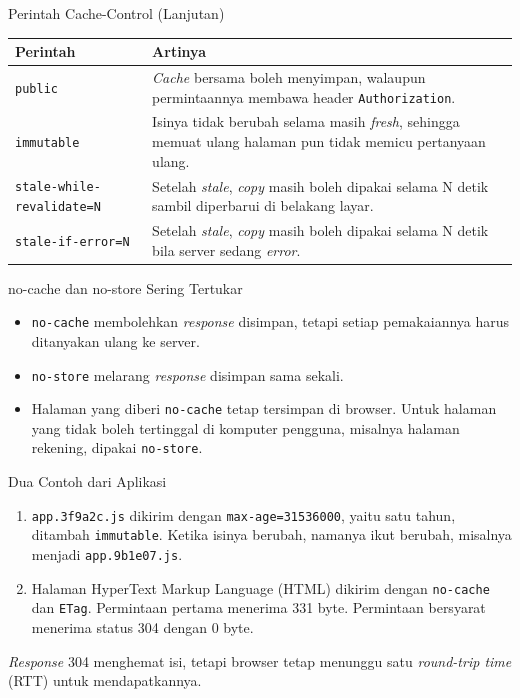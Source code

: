 \documentclass[aspectratio=169, table, 12pt]{beamer}
\begin{document}
\begin{frame}{{\Large Perintah Cache-Control (Lanjutan)}}
  \vspace{6pt}
  \centering
  {\footnotesize
  \begin{tabularx}{\textwidth}{lX}
    \hline
    \textbf{Perintah} & \textbf{Artinya} \\
    \hline
    \texttt{public} & \textit{Cache} bersama boleh menyimpan, walaupun permintaannya membawa header \texttt{Authorization}. \\
    \hline
    \texttt{immutable} & Isinya tidak berubah selama masih \textit{fresh}, sehingga memuat ulang halaman pun tidak memicu pertanyaan ulang. \\
    \hline
    \texttt{stale-while-revalidate=N} & Setelah \textit{stale}, \textit{copy} masih boleh dipakai selama N detik sambil diperbarui di belakang layar. \\
    \hline
    \texttt{stale-if-error=N} & Setelah \textit{stale}, \textit{copy} masih boleh dipakai selama N detik bila server sedang \textit{error}. \\
    \hline
  \end{tabularx}}
\end{frame}

\begin{frame}{{\Large no-cache dan no-store Sering Tertukar}}
  \vspace{10pt}
  \begin{itemize}
    \item \texttt{no-cache} membolehkan \textit{response} disimpan, tetapi setiap
          pemakaiannya harus ditanyakan ulang ke server.
    \item \texttt{no-store} melarang \textit{response} disimpan sama sekali.
    \item Halaman yang diberi \texttt{no-cache} tetap tersimpan di browser.
          Untuk halaman yang tidak boleh tertinggal di komputer pengguna,
          misalnya halaman rekening, dipakai \texttt{no-store}.
  \end{itemize}
\end{frame}

\begin{frame}{{\Large Dua Contoh dari Aplikasi}}
  \vspace{8pt}
  \begin{enumerate}
    \item \texttt{app.3f9a2c.js} dikirim dengan \texttt{max-age=31536000},
          yaitu satu tahun, ditambah \texttt{immutable}. Ketika isinya
          berubah, namanya ikut berubah, misalnya menjadi
          \texttt{app.9b1e07.js}.
    \item Halaman HyperText Markup Language (HTML) dikirim dengan
          \texttt{no-cache} dan \texttt{ETag}. Permintaan pertama menerima 331
          byte. Permintaan bersyarat menerima status 304 dengan 0 byte.
  \end{enumerate}
  \vspace{8pt}
  {\footnotesize \textit{Response} 304 menghemat isi, tetapi browser tetap menunggu satu
  \textit{round-trip time} (RTT) untuk mendapatkannya.}
\end{frame}
\end{document}
